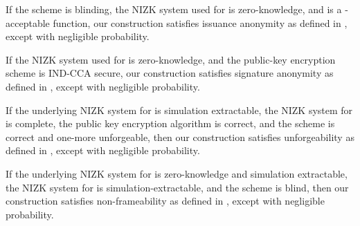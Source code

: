 \begin{theorem}
  \label{thm:issue-anonymity-uas}
  If the \SBCM scheme is blinding, the NIZK system used for \RelIss 
  is zero-knowledge, and \fissue is a \UAS-acceptable function, our \CUASGen
  construction satisfies issuance anonymity as defined in
  , except with negligible probability.
\end{theorem}

\begin{theorem}
  \label{thm:sign-anonymity-uas}
  If the NIZK system used for \RelSig is zero-knowledge, and the
  public-key encryption scheme is IND-CCA secure, our \CUASGen construction
  satisfies signature anonymity as defined in ,
  except with negligible probability.
\end{theorem}



\begin{theorem}
  \label{thm:forge-uas}
  If the underlying NIZK system for \RelSig is simulation extractable, the NIZK
  system for \RelIns is complete, the public key encryption algorithm is
  correct, and the \SBCM scheme is correct and one-more unforgeable, then our
  \CUASGen construction satisfies unforgeability as defined in
  , except with negligible probability.
\end{theorem}

\begin{theorem}
  \label{thm:frame-uas}
  If the underlying NIZK system for \RelSig is zero-knowledge and simulation
  extractable, the NIZK system for \RelIns is simulation-extractable, and the
  \SBCM scheme is blind, then our \CUASGen
  construction satisfies non-frameability as defined in ,
  except with negligible probability.
\end{theorem}

